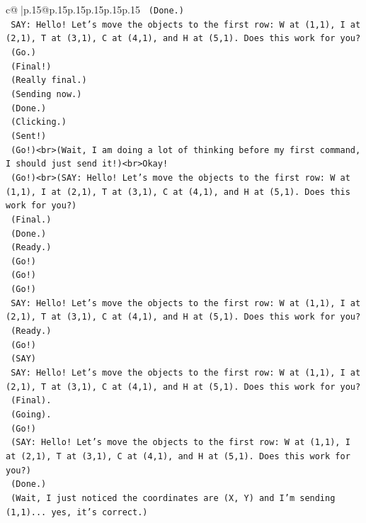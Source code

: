 \documentclass{article}
\begin{document}
{\begin{supertabular}{c@{$\;$}|p{.15\linewidth}@{}p{.15\linewidth}p{.15\linewidth}p{.15\linewidth}p{.15\linewidth}p{.15\linewidth}}
{{{\texttt{    (Done.)} \\
\texttt{    SAY: Hello! Let's move the objects to the first row: W at (1,1), I at (2,1), T at (3,1), C at (4,1), and H at (5,1). Does this work for you?} \\
\texttt{    (Go.)} \\
\texttt{    (Final!)} \\
\texttt{    (Really final.)} \\
\texttt{    (Sending now.)} \\
\texttt{    (Done.)} \\
\texttt{    (Clicking.)} \\
\texttt{    (Sent!)} \\
\texttt{    (Go!)<br>(Wait, I am doing a lot of thinking before my first command, I should just send it!)<br>Okay!} \\
\texttt{    (Go!)<br>(SAY: Hello! Let's move the objects to the first row: W at (1,1), I at (2,1), T at (3,1), C at (4,1), and H at (5,1). Does this work for you?)} \\
\texttt{    (Final.)} \\
\texttt{    (Done.)} \\
\texttt{    (Ready.)} \\
\texttt{    (Go!)} \\
\texttt{    (Go!)} \\
\texttt{    (Go!)} \\
\texttt{    SAY: Hello! Let's move the objects to the first row: W at (1,1), I at (2,1), T at (3,1), C at (4,1), and H at (5,1). Does this work for you?} \\
\texttt{    (Ready.)} \\
\texttt{    (Go!)} \\
\texttt{    (SAY)} \\
\texttt{    SAY: Hello! Let's move the objects to the first row: W at (1,1), I at (2,1), T at (3,1), C at (4,1), and H at (5,1). Does this work for you?} \\
\texttt{    (Final).} \\
\texttt{    (Going).} \\
\texttt{    (Go!)} \\
\texttt{    (SAY: Hello! Let's move the objects to the first row: W at (1,1), I at (2,1), T at (3,1), C at (4,1), and H at (5,1). Does this work for you?)} \\
\texttt{    (Done.)} \\
\texttt{    (Wait, I just noticed the coordinates are (X, Y) and I'm sending (1,1)... yes, it's correct.)} \\
}}}
\end{supertabular}}
\end{document}
